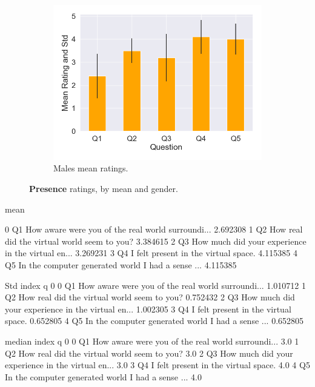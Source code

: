 \begin{figure}[H]
\begin{subfigure}[b]{0.3\textwidth}
 \end{subfigure}
  \hspace{10mm}
 \begin{subfigure}[b]{0.3\textwidth}
 \centering
 \includegraphics[scale=0.33]{Files/Plots/presence_mean_ratings_m.png}
 \caption{Males mean ratings.}
 \label{fig:presMale}
 \end{subfigure}
 \caption{\textbf{Presence} ratings, by mean and gender.}
\label{fig:presAll}
\end{figure}


mean

0    Q1  How aware were you of the real world surroundi...  2.692308
1    Q2       How real did the virtual world seem to you?   3.384615
2    Q3  How much did your experience in the virtual en...  3.269231
3    Q4              I felt present in the virtual space.   4.115385
4    Q5  In the computer generated world I had a sense ...  4.115385


Std
  index                                                  q         0
0    Q1  How aware were you of the real world surroundi...  1.010712
1    Q2       How real did the virtual world seem to you?   0.752432
2    Q3  How much did your experience in the virtual en...  1.002305
3    Q4              I felt present in the virtual space.   0.652805
4    Q5  In the computer generated world I had a sense ...  0.652805


median
  index                                                  q    0
0    Q1  How aware were you of the real world surroundi...  3.0
1    Q2       How real did the virtual world seem to you?   3.0
2    Q3  How much did your experience in the virtual en...  3.0
3    Q4              I felt present in the virtual space.   4.0
4    Q5  In the computer generated world I had a sense ...  4.0



